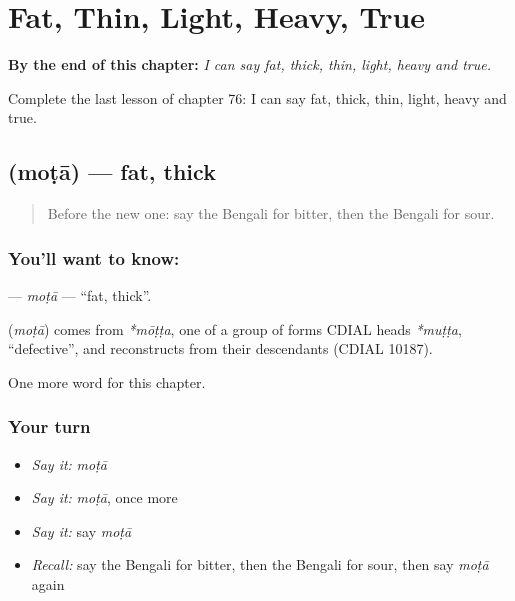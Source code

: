 
\chapter{Fat, Thin, Light, Heavy, True}
\label{ch:bn-fat-thin-light-heavy-true}

\begin{chapteropening}
\textbf{By the end of this chapter:} \emph{I can say fat, thick, thin, light, heavy and true.}

Complete the last lesson of chapter 76: I can say fat, thick, thin, light, heavy and true.
\end{chapteropening}

\section[\texorpdfstring{\bn{মোটা} (moṭā)}{মোটা (moṭā)}]{ (moṭā) — fat, thick}

\label{lesson:BN-C76-mota}



\begin{quote}
Before the new one: say the Bengali for bitter, then the Bengali for sour.
\end{quote}

\subsection*{You'll want to know: }
\textbf{} — \emph{moṭā} — \textquotedblleft{}fat, thick\textquotedblright{}.

\begin{cousinweb}
\textbf{} (\emph{moṭā}) comes from \emph{*mōṭṭa}, one of a group of forms CDIAL heads \emph{*muṭṭa}, \textquotedblleft{}defective\textquotedblright{}, and reconstructs from their descendants (CDIAL 10187).
\end{cousinweb}

\begin{grammarlens}[title={What you've built}]
One more word for this chapter.
\end{grammarlens}

\subsection*{Your turn}
\begin{itemize}
\raggedright
  \item \emph{Say it:} \emph{moṭā}
  \item \emph{Say it:} \emph{moṭā}, once more
  \item \emph{Say it:} say \emph{moṭā}
  \item \emph{Recall:} say the Bengali for bitter, then the Bengali for sour, then say \emph{moṭā} again
\end{itemize}

